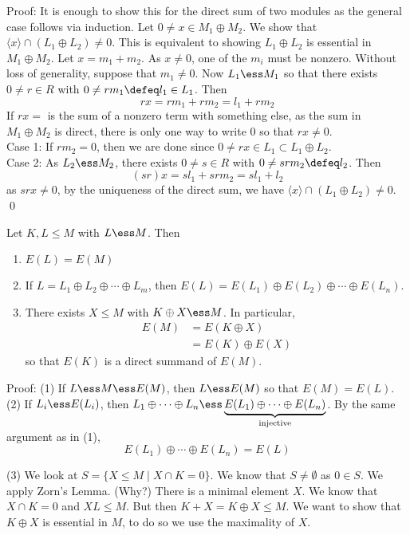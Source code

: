 Proof: It is enough to show this for the direct sum of two modules as the general case follows via induction. Let $0 \neq x \in  M_1 \oplus M_2$. We show that $\langle x \rangle \cap (L_1 \oplus L_2) \neq 0$. This is equivalent to showing $L_1 \oplus L_2$ is essential in $M_1 \oplus M_2$. Let $x=m_1+m_2$. As $x \neq 0$, one of the $m_i$ must be nonzero. Without loss of generality, suppose that $m_1 \neq 0$. Now $L_1 \ess M_1$ so that there exists $0 \neq r \in R$ with $0 \neq rm_1\defeq l_1 \in L_1$. Then
\[
rx=rm_1+rm_2=l_1+rm_2
\]
If $rx=$ is the sum of a nonzero term with something else, as the sum in $M_1 \oplus M_2$ is direct, there is only one way to write 0 so that $rx \neq 0$. \\

Case 1: If $rm_2=0$, then we are done since $0 \neq rx \in L_1 \subset L_1 \oplus L_2$. \\

Case 2: As $L_2 \ess M_2$, there exists $0\neq s \in R$ with $0\neq srm_2\defeq l_2$. Then
\[
(sr)x=sl_1+srm_2=sl_1+l_2
\]
as $srx \neq 0$, by the uniqueness of the direct sum, we have $\langle x \rangle \cap (L_1 \oplus L_2) \neq 0$. \qed \\

\begin{prop}
Let $K,L \leq M$ with $L \ess M$. Then
\begin{enumerate}[(1)]
\item $E(L)=E(M)$
\item If $L=L_1 \oplus L_2 \oplus \cdots \oplus L_m$, then $E(L)=E(L_1) \oplus E(L_2) \oplus \cdots \oplus E(L_n)$.
\item There exists $X \leq M$ with $K \oplus X \ess M$. In particular, 
\[
\begin{split}
E(M)&= E(K \oplus X) \\
&=E(K) \oplus E(X)
\end{split}
\]
so that $E(K)$ is a direct summand of $E(M)$. 
\end{enumerate}
\end{prop}

Proof: (1) If $L \ess M \ess E(M)$, then $L \ess E(M)$ so that $E(M)=E(L)$. \\

(2) If $L_i \ess E(L_i)$, then $L_1 \oplus \cdots \oplus L_n \ess \underbrace{E(L_1) \oplus \cdots \oplus E(L_n)}_{\text{injective}}$. By the same argument as in (1), 
\[
E(L_1) \oplus \cdots \oplus E(L_n)=E(L)
\]

(3) We look at $S=\{X \leq M \;|\; X \cap K=0\}$. We know that $S \neq \emptyset$ as $0 \in S$. We apply Zorn's Lemma. (Why?) There is a minimal element $X$. We know that $X \cap K=0$ and $XL \leq M$. But then $K+X =K \oplus X \leq M$. We want to show that $K\oplus X$ is essential in $M$, to do so we use the maximality of $X$. 


